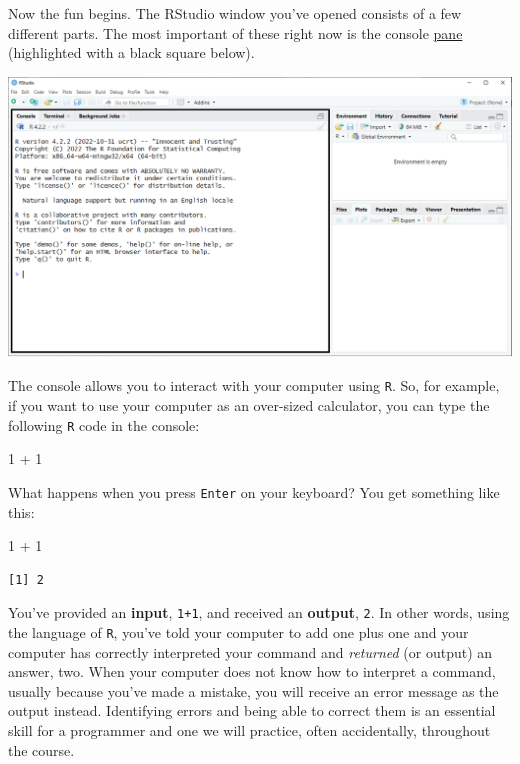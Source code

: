 \documentclass[
  letterpaper,
]{book}
\newenvironment{Shaded}{\begin{snugshade}}{\end{snugshade}}
\newcommand{\DecValTok}[1]{\textcolor[rgb]{0.68,0.00,0.00}{#1}}
\newcommand{\SpecialCharTok}[1]{\textcolor[rgb]{0.37,0.37,0.37}{#1}}
\begin{document}
Now the fun begins. The RStudio window you've opened consists of a few
different parts. The most important of these right now is the console
\href{https://docs.posit.co/ide/user/ide/guide/ui/ui-panes.html}{pane}
(highlighted with a black square below).

\includegraphics{images/RStudio console box.png}

The console allows you to interact with your computer using \texttt{R}.
So, for example, if you want to use your computer as an over-sized
calculator, you can type the following \texttt{R} code in the console:

\begin{Shaded}
\begin{Highlighting}[]
\DecValTok{1} \SpecialCharTok{+} \DecValTok{1}
\end{Highlighting}
\end{Shaded}

What happens when you press \texttt{Enter} on your keyboard? You get
something like this:

\begin{Shaded}
\begin{Highlighting}[]
\DecValTok{1} \SpecialCharTok{+} \DecValTok{1}
\end{Highlighting}
\end{Shaded}

\begin{verbatim}
[1] 2
\end{verbatim}

You've provided an \textbf{input}, \texttt{1+1}, and received an
\textbf{output}, \texttt{2}. In other words, using the language of
\texttt{R}, you've told your computer to add one plus one and your
computer has correctly interpreted your command and \emph{returned} (or
output) an answer, two. When your computer does not know how to
interpret a command, usually because you've made a mistake, you will
receive an error message as the output instead. Identifying errors and
being able to correct them is an essential skill for a programmer and
one we will practice, often accidentally, throughout the course.
\end{document}
